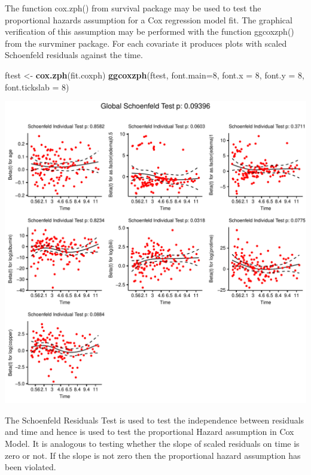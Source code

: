 \documentclass[]{article}
\newenvironment{Shaded}{\begin{snugshade}}{\end{snugshade}}
\newcommand{\KeywordTok}[1]{\textcolor[rgb]{0.13,0.29,0.53}{\textbf{#1}}}
\newcommand{\DataTypeTok}[1]{\textcolor[rgb]{0.13,0.29,0.53}{#1}}
\newcommand{\DecValTok}[1]{\textcolor[rgb]{0.00,0.00,0.81}{#1}}
\newcommand{\StringTok}[1]{\textcolor[rgb]{0.31,0.60,0.02}{#1}}
\newcommand{\NormalTok}[1]{#1}
\begin{document}
The function cox.zph() from survival package may be used to test the
proportional hazards assumption for a Cox regression model fit. The
graphical verification of this assumption may be performed with the
function ggcoxzph() from the survminer package. For each covariate it
produces plots with scaled Schoenfeld residuals against the time.

\begin{Shaded}
\begin{Highlighting}[]
\NormalTok{ftest <-}\StringTok{ }\KeywordTok{cox.zph}\NormalTok{(fit.coxph)}
\KeywordTok{ggcoxzph}\NormalTok{(ftest, }\DataTypeTok{font.main=}\DecValTok{8}\NormalTok{, }\DataTypeTok{font.x =}  \DecValTok{8}\NormalTok{, }\DataTypeTok{font.y =} \DecValTok{8}\NormalTok{, }\DataTypeTok{font.tickslab =} \DecValTok{8}\NormalTok{)}
\end{Highlighting}
\end{Shaded}

\includegraphics{survival_pbc_files/figure-latex/unnamed-chunk-37-1.pdf}

The Schoenfeld Residuals Test is used to test the independence between
residuals and time and hence is used to test the proportional Hazard
assumption in Cox Model. It is analogous to testing whether the slope of
scaled residuals on time is zero or not. If the slope is not zero then
the proportional hazard assumption has been violated.
\end{document}
